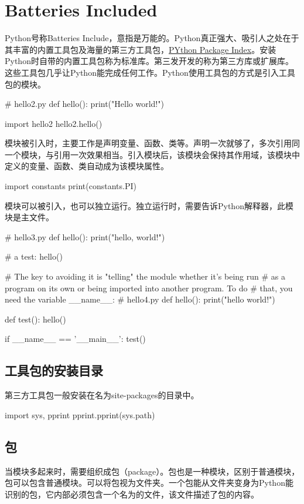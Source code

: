 \section{Batteries Included}
Python号称Batteries Include，意指是万能的。Python真正强大、吸引人之处在于其丰富的内置工具包及海量的第三方工具包，\href{https://pypi.python.org/pypi}{PYthon Package Index}。安装Python时自带的内置工具包称为标准库。第三发开发的称为第三方库或扩展库。这些工具包几乎让Python能完成任何工作。Python使用工具包的方式是引入工具包的模块。
\begin{python}
# hello2.py
def hello():
    print("Hello world!")

import hello2
hello2.hello()  
\end{python}
模块被引入时，主要工作是声明变量、函数、类等。声明一次就够了，多次引用同一个模块，与引用一次效果相当。引入模块后，该模块会保持其作用域，该模块中定义的变量、函数、类自动成为该模块属性。
\begin{python}
import constants
print(constants.PI)
\end{python}
模块可以被引入，也可以独立运行。独立运行时，需要告诉Python解释器，此模块是主文件。
\begin{python}
# hello3.py
def hello():
    print("hello, world!")

# a test:
hello()

# The key to avoiding it is "telling" the module whether it's being run
# as a program on its own or being imported into another program.  To do
# that,  you need the variable __name__:
# hello4.py
def hello():
    print("hello world!")

def test():
    hello()

if __name__ == '__main__':
    test()
\end{python}
\subsection{工具包的安装目录}
第三方工具包一般安装在名为site-packages的目录中。
\begin{python}
import sys, pprint
pprint.pprint(sys.path)
\end{python}
\subsection{包}
当模块多起来时，需要组织成包（package）。包也是一种模块，区别于普通模块，包可以包含普通模块。可以将包视为文件夹。一个包能从文件夹变身为Python能识别的包，它内部必须包含一个名为的文件，该文件描述了包的内容。

